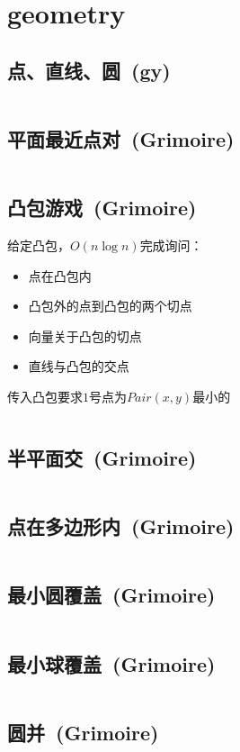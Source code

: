 \chapter{geometry}
\section{点、直线、圆\ \small(gy)}
	\inputminted{cpp}{geometry/basic_geometry.cpp}
\section{平面最近点对\ \small(Grimoire)}
	\inputminted{cpp}{geometry/nearest_points.cpp}
\section{凸包游戏\ \small(Grimoire)}
	给定凸包，$ O(n \log n) $完成询问：
	\begin{itemize}
		\item 点在凸包内
		\item 凸包外的点到凸包的两个切点
		\item 向量关于凸包的切点
		\item 直线与凸包的交点
	\end{itemize}
	传入凸包要求$ 1 $号点为$ Pair(x, y) $最小的
	\inputminted{cpp}{geometry/convex_game.cpp}
\section{半平面交\ \small(Grimoire)}
	\inputminted{cpp}{geometry/half_plane_intersect.cpp}
\section{点在多边形内\ \small(Grimoire)}
	\inputminted{cpp}{geometry/point_in_polygon.cpp}
\section{最小圆覆盖\ \small(Grimoire)}
	\inputminted{cpp}{geometry/minimal_coverage_circle.cpp}
\section{最小球覆盖\ \small(Grimoire)}
	\inputminted{cpp}{geometry/minimal_coverage_ball.cpp}
\section{圆并\ \small(Grimoire)}
	\inputminted{cpp}{geometry/circle_union.cpp}
